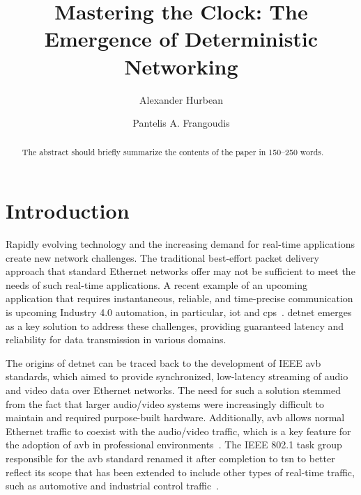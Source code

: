 \documentclass[runningheads]{llncs}
\begin{document}
\title{Mastering the Clock: The Emergence of Deterministic Networking}
\author{Alexander Hurbean \and
  Pantelis A. Frangoudis}

\maketitle              %

\begin{abstract}
  The abstract should briefly summarize the contents of the paper in
  150--250 words.
  
\end{abstract}

\section{Introduction}

Rapidly evolving technology and the increasing demand for real-time applications create new network challenges. The traditional best-effort packet delivery approach that standard Ethernet networks offer may not be sufficient to meet the needs of such real-time applications. A recent example of an upcoming application that requires instantaneous, reliable, and time-precise communication is upcoming Industry 4.0 automation, in particular, \gls{iot} and \gls{cps}~\cite{Wollschlaeger2017}. \gls{detnet} emerges as a key solution to address these challenges, providing guaranteed latency and reliability for data transmission in various domains.

The origins of \gls{detnet} can be traced back to the development of IEEE \gls{avb} standards, which aimed to provide synchronized, low-latency streaming of audio and video data over Ethernet networks. The need for such a solution stemmed from the fact that larger audio/video systems were increasingly difficult to maintain and required purpose-built hardware. Additionally, \gls{avb} allows normal Ethernet traffic to coexist with the audio/video traffic, which is a key feature for the adoption of \gls{avb} in professional environments~\cite{Lim2012}. The IEEE 802.1 task group responsible for the \gls{avb} standard renamed it after completion to \gls{tsn} to better reflect its scope that has been extended to include other types of real-time traffic, such as automotive and industrial control traffic~\cite{Wollschlaeger2017}.
\end{document}
